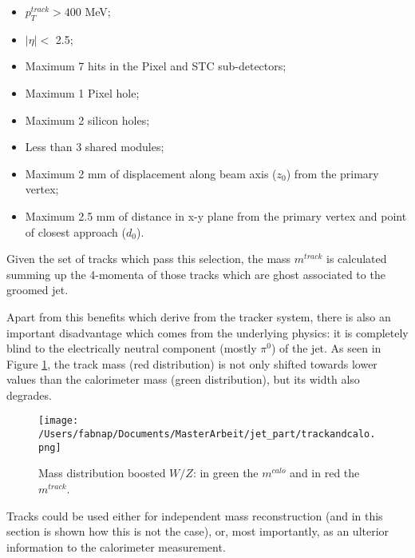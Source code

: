 \begin{itemize}
 \item $p_T^{track} > 400$ MeV;
 \item $|\eta|<$ 2.5;
 \item Maximum 7 hits in the Pixel and STC sub-detectors;
 \item Maximum 1 Pixel hole;
 \item Maximum 2 silicon holes;
 \item Less than 3 shared modules;
 \item Maximum 2 mm of displacement along beam axis ($z_0$) from the primary vertex;
 \item Maximum 2.5 mm of distance in x-y plane from the primary vertex and point of closest approach ($d_0$).
\end{itemize}

Given the set of tracks which pass this selection, the mass $m^{track}$ is calculated summing up the 4-momenta of those tracks which are ghost associated to the groomed jet.


Apart from this benefits which derive from the tracker system, there is also an important disadvantage which comes from the underlying physics: it is completely blind to the electrically neutral component (mostly $\pi^0$) of the jet. As seen in Figure \ref{fig:trackandcalo}, the track mass (red distribution) is not only shifted towards lower values than the calorimeter mass (green distribution), but its width also degrades. 

\begin{figure}[!ht]
  \centering
      \texttt{[image: /Users/fabnap/Documents/MasterArbeit/jet\_part/trackandcalo.png]}
  \caption[Mass distribution for boosted $W/Z$]{Mass distribution boosted $W/Z$: in green the $m^{calo}$ and in red the $m^{track}$. }
  \label{fig:trackandcalo}
\end{figure}

Tracks could be used either for independent mass reconstruction (and in this section is shown how this is not the case), or, most importantly, as an ulterior information to the calorimeter measurement.

